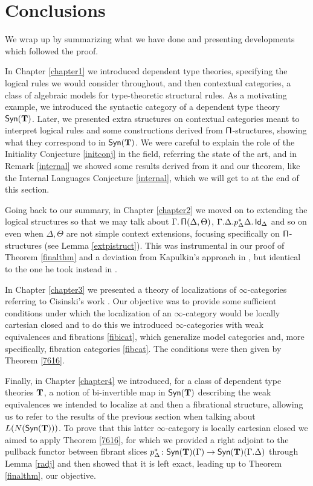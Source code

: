 \section{Conclusions}

We wrap up by summarizing what we have done and presenting developments which
followed the proof.

\noindent
In Chapter \ref{chapter1} we introduced dependent type theories, specifying the
logical rules we would consider throughout, and then contextual categories, a
class of algebraic models for type-theoretic structural rules. As a motivating
example, we introduced the syntactic category of a dependent type theory
$\mathsf{Syn}(\mathbf{T})$. Later, we presented extra structures on contextual categories meant
to interpret logical rules and some constructions derived from
$\operatorname{\mathsf{\Pi}}$-structures, showing what they correspond to in $\mathsf{Syn}(\mathbf{T})$. We were careful
to explain the role of the Initiality Conjecture \ref{initconj} in the field,
referring the state of the art, and
in Remark \ref{internal} we showed some results derived from it and our
theorem, like the Internal Languages Conjecture \ref{internal}, which we will
get to at the end of this section.

\noindent
Going back to our summary, in Chapter \ref{chapter2} we moved on to extending
the logical structures so that we may talk about $\Gamma.\operatorname{\mathsf{\Pi}}(\Delta,\Theta)$,
$\Gamma.\Delta.p^*_\Delta\Delta.\operatorname{\mathsf{Id}}_\Delta$ and so on even when $\Delta,\Theta$
are not simple context extensions, focusing specifically on $\operatorname{\mathsf{\Pi}}$-structures
(see Lemma \ref{extpistruct}). This was instrumental in our proof of Theorem
\ref{finalthm} and a deviation from Kapulkin's approach in \cite{Kap14}, but
identical to the one he took instead in \cite{Kap17}.

\noindent
In Chapter \ref{chapter3} we presented a theory of localizations of
$\infty$-categories referring to Cisinski's work \cite{Cis19}. Our objective was
to provide some sufficient conditions under which the localization of an
$\infty$-category would be locally cartesian closed and to do this we introduced
$\infty$-categories with weak equivalences and fibrations \ref{fibicat}, which
generalize model categories and, more specifically, fibration categories
\ref{fibcat}. The conditions were then given by Theorem \ref{7616}.

\noindent
Finally, in Chapter \ref{chapter4} we introduced, for a class of dependent type
theories $\operatorname{\mathbf{T}}$, a notion of bi-invertible map in $\mathsf{Syn}(\mathbf{T})$ describing the weak
equivalences we intended to localize at and then a fibrational structure,
allowing us to refer to the results of the previous section when talking about
$L(N(\mathsf{Syn}(\mathbf{T})))$. To prove that this latter $\infty$-category is locally
cartesian closed we aimed to apply Theorem \ref{7616}, for which
we provided a right adjoint to the pullback functor between fibrant
slices $p^*_\Delta\colon\mathsf{Syn}(\mathbf{T})(\Gamma)\rightarrow\mathsf{Syn}(\mathbf{T})(\Gamma.\Delta)$
through Lemma \ref{radj} and then showed that it is left exact, leading up to
Theorem \ref{finalthm}, our objective.

